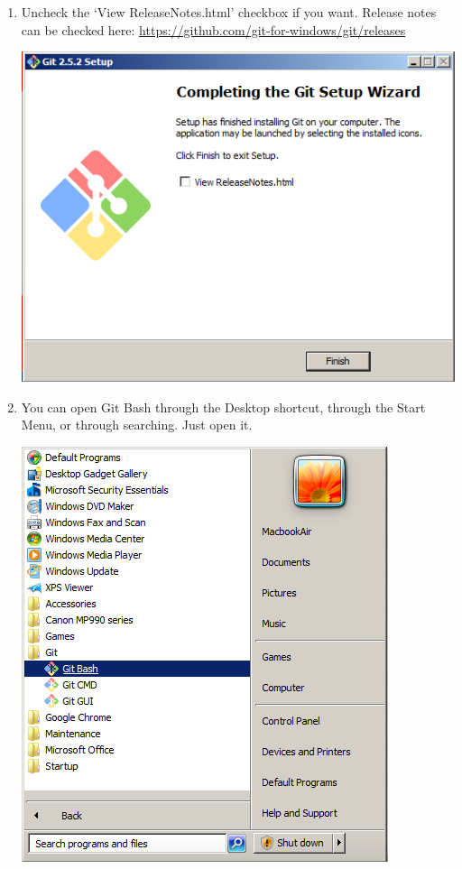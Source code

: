 \documentclass[11pt,fleqn]{article}
\theoremstyle{definition}
\begin{document}
\begin{enumerate}[Step 1.]
\item Uncheck the `View ReleaseNotes.html' checkbox if you want. Release notes
    can be checked here: \url{https://github.com/git-for-windows/git/releases}
\begin{center}
\includegraphics[scale=0.6]{gitwininstall11.png}
\end{center}

\newpage
\item You can open Git Bash through the Desktop shortcut, through the Start
    Menu, or through searching. Just open it.
\begin{center}
\includegraphics[scale=0.6]{gitwininstall12.png}
\end{center}


\end{enumerate}
\end{document}
